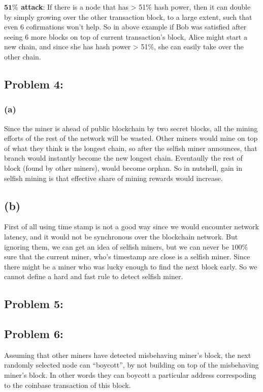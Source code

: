 \documentclass[a4paper]{article}
\begin{document}
\textbf{$\mathbf{51 \%}$ attack}: If there is a node that has > 51\% hash power, then it can double by
simply growing over the other transaction block, to a large extent, such that even 6 cofirmations won't help.
So in above example if Bob was satisfied after seeing 6 more blocks on top of current transaction's block, Alice
might start a new chain, and since she has hash power > 51\%, she can easily take over the other chain.

\subsection*{Problem 4:}
\subsubsection*{(a)}
Since the miner is ahead of public blockchain by two secret blocks, all the mining efforts of the rest of the network
will be wasted. Other miners would mine on top of what they think is the longest chain, so after the
selfish miner announces, that branch would instantly become the new longest chain. Eventaully 
the rest of block (found by other miners), would become orphan. So in nutshell, gain in selfish mining
is that effective share of mining rewards would increase.

\subsection*{(b)}
First of all using time stamp is not a good way since we would encounter network latency, and it would
not be synchronous over the blockchain network. But ignoring them, we can get an idea of selfish miners, but
we can never be $100\%$ sure that the current miner, who's timestamp are close is a selfish miner. Since there
might be a miner who was lucky enough to find the next block early. So we cannot define a hard and fast rule to detect
selfish miner.


\subsection*{Problem 5:}


\subsection*{Problem 6:}
Assuming that other miners have detected misbehaving miner's block, the next randomly selected node can
``boycott'', by not building on top of the misbehaving miner's block. In other words they can boycott
a particular address correspoding to the coinbase transaction of this block. \\
\end{document}
